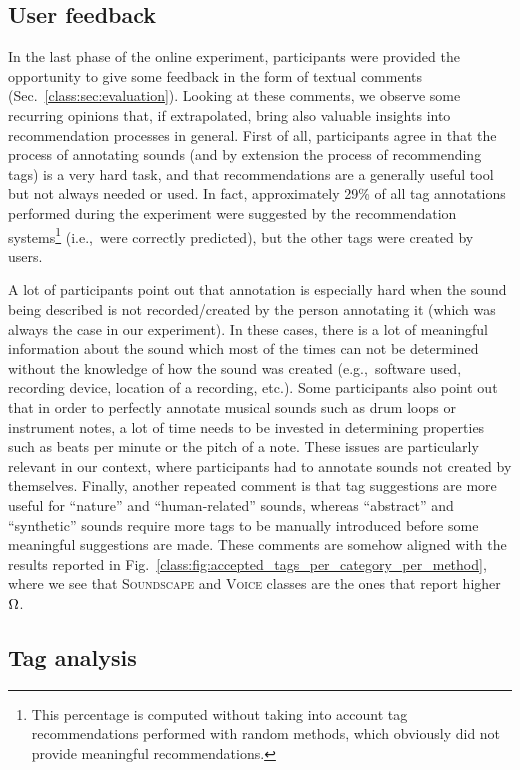\subsection{User feedback}
\label{class:sec:user_feedback}

In the last phase of the online experiment, participants were provided the opportunity to give some feedback in the form of textual comments (Sec.~\ref{class:sec:evaluation}). Looking at these comments, we observe some recurring opinions that,  if extrapolated, bring also valuable insights into recommendation processes in general. First of all, participants agree in that the process of annotating sounds (and by extension the process of recommending tags) is a very hard task, and that recommendations are a generally useful tool but not always needed or used. In fact, approximately 29\% of all tag annotations performed during the experiment were suggested by the recommendation systems\footnote{This percentage is computed without taking into account tag recommendations performed with random methods, which obviously did not provide meaningful recommendations.} (i.e.,~were correctly predicted), but the other tags were created by users.

A lot of participants point out that annotation is especially hard when the sound being described is not recorded/created by the person annotating it (which was always the case in our experiment). In these cases, there is a lot of meaningful information about the sound which most of the times can not be determined without the knowledge of how the sound was created (e.g.,~software used, recording device, location of a recording, etc.). Some participants also point out that in order to perfectly annotate musical sounds such as drum loops or instrument notes, a lot of time needs to be invested in determining properties such as beats per minute or the pitch of a note. These issues are particularly relevant in our context, where participants had to annotate sounds not created by themselves. Finally, another repeated comment is that tag suggestions are more useful for ``nature'' and ``human-related'' sounds, whereas ``abstract'' and ``synthetic'' sounds require more tags to be manually introduced 
before some meaningful suggestions are made. These comments are somehow aligned with the results reported in Fig.~\ref{class:fig:accepted_tags_per_category_per_method}, where we see that \textsc{Soundscape} and \textsc{Voice} classes are the ones that report higher $\Omega$.


\subsection{Tag analysis}
\label{class:sec:tag_examples}

